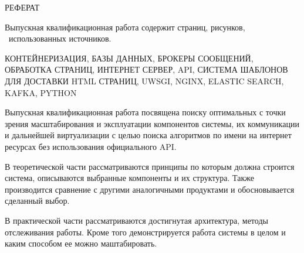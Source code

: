 \begin{center}
РЕФЕРАТ
\end{center}









Выпускная квалификационная работа содержит \pageref{LastPage} страниц, \totfig{}
рисунков, \ использованных источников.

\noindent КОНТЕЙНЕРИЗАЦИЯ, БАЗЫ ДАННЫХ, БРОКЕРЫ СООБЩЕНИЙ, ОБРАБОТКА СТРАНИЦ, ИНТЕРНЕТ
СЕРВЕР, API, СИСТЕМА ШАБЛОНОВ ДЛЯ ДОСТАВКИ HTML СТРАНИЦ, UWSGI, NGINX, ELASTIC
SEARCH, KAFKA, PYTHON

Выпускная квалификационная работа посвящена поиску оптимальных с точки зрения
масштабирования и эксплуатации компонентов системы, их коммуникации и дальнейшей
виртуализации с целью поиска алгоритмов по имени на интернет ресурсах без
использования официального API.

В теоретической части рассматриваются принципы по которым должна строится
система, описываются выбранные компоненты и их структура. Также производится
сравнение с другими аналогичными продуктами и обосновывается сделанный выбор.

В практической части рассматриваются достигнутая архитектура, методы
отслеживания работы. Кроме того демонстрируется работа системы в целом и каким
способом ее можно маштабировать.
